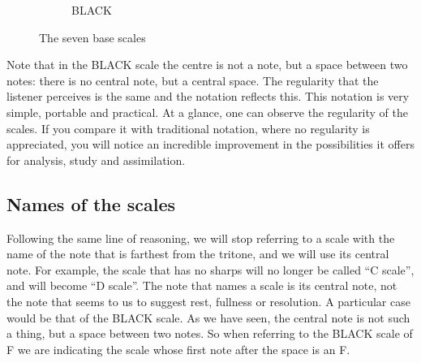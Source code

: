 \documentclass[]{report}
\begin{document}
\begin{figure}[H]
\begin{subfigure}{0.3\textwidth}
		\caption{\textsf{BLACK}}

	\end{subfigure}
	\hfill
	\caption{The seven base scales}\label{fig:the-seven-scales}
\end{figure}
Note that in the \textsf{BLACK} scale the centre is not a note, but a space between two notes: there is no central note, but a central space. The regularity that the listener perceives is the same and the notation reflects this.
This notation is very simple, portable and practical. At a glance, one can observe the regularity of the scales. If you compare it with traditional notation, where no regularity is appreciated, you will notice an incredible improvement in the possibilities it offers for analysis, study and assimilation.
\subsection{Names of the scales}
Following the same line of reasoning, we will stop referring to a scale with the name of the note that is farthest from the tritone, and we will use its central note. For example, the scale that has no sharps will no longer be called ``C scale'', and will become ``D scale''. The note that names a scale is its central note, not the note that seems to us to suggest rest, fullness or resolution.
A particular case would be that of the \textsf{BLACK} scale. As we have seen, the central note is not such a thing, but a space between two notes. So when referring to the \textsf{BLACK} scale of F we are indicating the scale whose first note after the space is an F.
\end{document}
